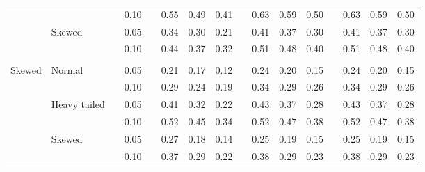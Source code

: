 \documentclass{article} %
\begin{document}
\begin{table}[ht]
\begin{scriptsize}
\begin{center}
\begin{tabular}{ll p{.1cm} c p{.1cm} rrr p{.1cm} rrr p{.1cm} rrr}
             &              && 0.10 &&   0.55 & 0.49 & 0.41 && 0.63 & 0.59 & 0.50 && 0.63 & 0.59 & 0.50 \\ 
             & Skewed       && 0.05 &&   0.34 & 0.30 & 0.21 && 0.41 & 0.37 & 0.30 && 0.41 & 0.37 & 0.30 \\ 
             &              && 0.10 &&   0.44 & 0.37 & 0.32 && 0.51 & 0.48 & 0.40 && 0.51 & 0.48 & 0.40 \\ 
             &&&&&&&&&&&&&&&\\
Skewed       & Normal       && 0.05 &&   0.21 & 0.17 & 0.12 && 0.24 & 0.20 & 0.15 && 0.24 & 0.20 & 0.15 \\ 
             &              && 0.10 &&   0.29 & 0.24 & 0.19 && 0.34 & 0.29 & 0.26 && 0.34 & 0.29 & 0.26 \\ 
             & Heavy tailed && 0.05 &&   0.41 & 0.32 & 0.22 && 0.43 & 0.37 & 0.28 && 0.43 & 0.37 & 0.28 \\ 
             &              && 0.10 &&   0.52 & 0.45 & 0.34 && 0.52 & 0.47 & 0.38 && 0.52 & 0.47 & 0.38 \\ 
             & Skewed       && 0.05 &&   0.27 & 0.18 & 0.14 && 0.25 & 0.19 & 0.15 && 0.25 & 0.19 & 0.15 \\ 
             &              && 0.10 &&   0.37 & 0.29 & 0.22 && 0.38 & 0.29 & 0.23 && 0.38 & 0.29 & 0.23 \\ 




\end{tabular}
\end{center}
\end{scriptsize}
\end{table}
\end{document}

